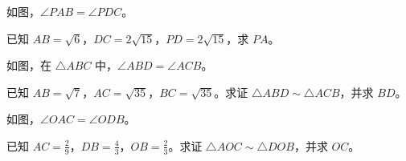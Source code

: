 \documentclass{exam-zh}
\begin{document}

\begin{problem}[points=10]
  \noindent
  \begin{minipage}[t]{\dimexpr\linewidth-60mm-6mm\relax}
    \vspace{0pt}
    如图，$\angle PAB=\angle PDC$。

已知 $AB=\sqrt{6}$，$DC=2\sqrt{15}$，$PD=2\sqrt{15}$，求 $PA$。
    
  \end{minipage}\hfill
  \begin{diagramcoltikz}{60mm}{沿题设等角的顶点顺序，找出两组三角形的对应边。}
  }
  \end{diagramcoltikz}
  \par\medskip
  \answerarea[48mm]
\end{problem}



\begin{problem}[points=10]
  \noindent
  \begin{minipage}[t]{\dimexpr\linewidth-60mm-6mm\relax}
    \vspace{0pt}
    如图，在 $\triangle ABC$ 中，$\angle ABD=\angle ACB$。

已知 $AB=\sqrt{7}$，$AC=\sqrt{35}$，$BC=\sqrt{35}$。求证 $\triangle ABD\sim\triangle ACB$，并求 $BD$。
    
  \end{minipage}\hfill
  \begin{diagramcoltikz}{60mm}{先确认对应边，再判断题中的线段是否属于相似三角形。}
  }
  \end{diagramcoltikz}
  \par\medskip
  \answerarea[48mm]
\end{problem}



\begin{problem}[points=10]
  \noindent
  \begin{minipage}[t]{\dimexpr\linewidth-60mm-6mm\relax}
    \vspace{0pt}
    如图，$\angle OAC=\angle ODB$。

已知 $AC=\frac{2}{9}$，$DB=\frac{4}{3}$，$OB=\frac{2}{3}$。求证 $\triangle AOC\sim\triangle DOB$，并求 $OC$。
    
  \end{minipage}\hfill
  \begin{diagramcoltikz}{60mm}{先用对顶角补齐第二组等角，再按顶点顺序配边。}
  }
  \end{diagramcoltikz}
  \par\medskip
  \answerarea[48mm]
\end{problem}
\end{document}
